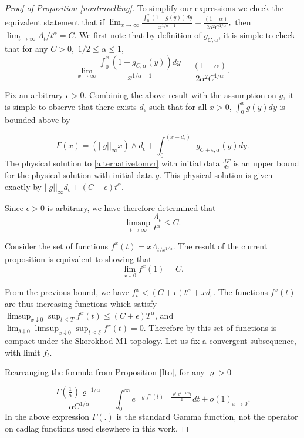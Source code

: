 \documentclass[11pt]{article}
\theoremstyle{plain}
\theoremstyle{remark}
\theoremstyle{definition}
\numberwithin{equation}{section}
\begin{document}
\begin{proof}[Proof of Proposition \ref{nontravelling}]

To simplify our expressions we check the equivalent statement that if $\lim_{x\rightarrow\infty}\frac{\int_0^x(1-g(y))dy}{x^{1/\alpha-1}}=\frac{(1-\alpha)}{2\alpha^2C^{1/\alpha}},$ then $\lim_{t\rightarrow\infty}\Lambda_t/t^\alpha=C$. 
We first note that by definition of $g_{C,\alpha}$, it is simple to check that for any $C>0,$ $1/2\leq \alpha\leq 1$, $$\lim_{x\rightarrow\infty}\frac{\int_0^x(1-g_{C,\alpha}(y))dy}{ x^{1/\alpha-1}}=\frac{(1-\alpha)}{2\alpha^2C^{1/\alpha}}.$$

Fix an arbitrary $\epsilon>0$. Combining the above result with the assumption on $g$, it is simple to observe that there exists $d_\epsilon$ such that for all $x>0$, $\int_0^xg(y)dy$ is bounded above by 

$$ F(x)=(||g||_\infty x)\wedge d_\epsilon+\int_0^{(x- d_\epsilon)_+}g_{C+\epsilon,\alpha}(y)dy.$$ 
The physical solution to \eqref{alternativetomvr} with initial data $\frac{dF}{dx}$ is an upper bound for the physical solution with initial data $g$. This physical solution is given exactly by $||g||_\infty d_\epsilon+(C+\epsilon)t^{\alpha}$.

    Since $\epsilon>0$ is arbitrary, we have therefore determined that $$\limsup_{t\rightarrow\infty}\frac{\Lambda_t}{t^{\alpha}}\leq C.$$

    Consider the set of functions $f^x(t)=x\Lambda_{t/x^{1/\alpha}}$. The result of the current proposition is equivalent to showing that $$\lim_{x\downarrow 0}f^x(1)=C.$$
    
    From the previous bound, we have $f_t^x<(C+\epsilon)t^\alpha+x d_\epsilon$. The functions $f^x(t)$ are thus increasing functions which satisfy $\limsup_{x \downarrow 0}\sup_{t\leq T} f^x(t)\leq (C+\epsilon)T^\alpha$, and 
    $\lim_{\delta\downarrow 0}\limsup_{x \downarrow 0}\sup_{t\leq \delta} f^x(t)=0$. Therefore by \cite[Theorem 12.12.2]{whitt}
    this set of functions is compact under the Skorokhod M1 topology. Let us fix a convergent subsequence, with limit $f_t$. 

    Rearranging the formula from Proposition \ref{Ito}, for any $\varrho>0$
    
    $$\frac{\Gamma(\frac{1}{\alpha})\varrho^{-1/\alpha}}{\alpha C^{1/\alpha}}=\int_0^\infty e^{-\varrho f^{x}(t)-\frac{\varrho^2x^{2-1/\alpha}t}{2}}dt+o(1)_{x\rightarrow 0}.$$
    In the above expression $\Gamma(.)$ is the standard Gamma function, not the operator on cadlag functions used elsewhere in this work.


\end{proof}
\end{document}
